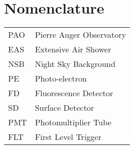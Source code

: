 \chapter*{Nomenclature}


\begin{tabular}{p{8em} p{30em}}
PAO & Pierre Auger Observatory \\
EAS & Extensive Air Shower \\
NSB & Night Sky Background \\
PE & Photo-electron \\
FD & Fluorescence Detector \\
SD & Surface Detector \\
PMT & Photomultiplier Tube \\
FLT & First Level Trigger
\end{tabular}